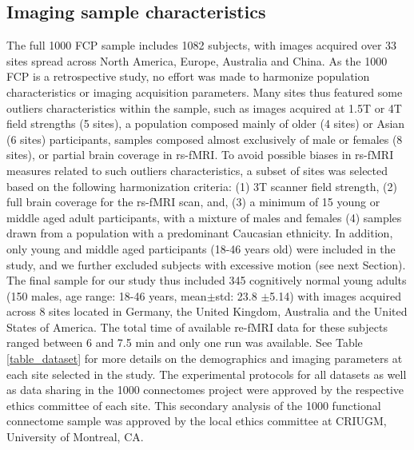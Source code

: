 \documentclass[authoryear]{elsarticle}
\begin{document}
\subsection{Imaging sample characteristics}
The full 1000 FCP sample includes 1082 subjects, with images acquired over 33 sites spread across North America, Europe, Australia and China. As the 1000 FCP is a retrospective study, no effort was made to harmonize population characteristics or imaging acquisition parameters. Many sites thus featured some outliers characteristics within the sample, such as images acquired at 1.5T or 4T field strengths (5 sites), a population composed mainly of older (4 sites) or Asian (6 sites) participants, samples composed almost exclusively of male or females (8 sites), or partial brain coverage in rs-fMRI. To avoid possible biases in rs-fMRI measures related to such outliers characteristics, a subset of sites was selected based on the following harmonization criteria: (1) 3T scanner field strength, (2) full brain coverage for the rs-fMRI scan, and, (3) a minimum of 15 young or middle aged adult participants, with a mixture of males and females (4) samples drawn from a population with a predominant Caucasian ethnicity. In addition, only young and middle aged participants (18-46 years old) were included in the study, and we further excluded subjects with excessive motion (see next Section). The final sample for our study thus included 345 cognitively normal young adults (150 males, age range: 18-46 years, mean$\pm$std: 23.8 $\pm$5.14) with images acquired across 8 sites located in Germany, the United Kingdom, Australia and the United States of America. The total time of available re-fMRI data for these subjects ranged between 6 and 7.5 min and only one run was available. See Table \ref{table_dataset} for more details on the demographics and imaging parameters at each site selected in the study. The experimental protocols for all datasets as well as data sharing in the 1000 connectomes project were approved by the respective ethics committee of each site. This secondary analysis of the 1000 functional connectome sample was approved by the local ethics committee at CRIUGM, University of Montreal, CA.

 
\end{document}
